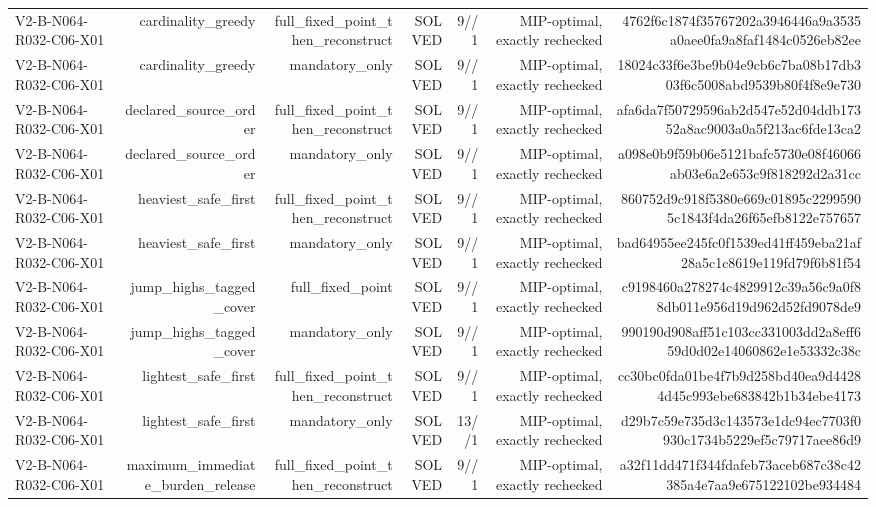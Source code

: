 {\begin{longtable}{lrrrrrr}
V2-B-N064-R032-C06-X01 & cardinality\_greedy & full\_fixed\_point\_then\_reconstruct & SOLVED & 9//1 & MIP-optimal, exactly rechecked & 4762f6c1874f35767202a3946446a9a3535a0aee0fa9a8faf1484c0526eb82ee \\
V2-B-N064-R032-C06-X01 & cardinality\_greedy & mandatory\_only & SOLVED & 9//1 & MIP-optimal, exactly rechecked & 18024c33f6e3be9b04e9cb6c7ba08b17db303f6c5008abd9539b80f4f8e9e730 \\
V2-B-N064-R032-C06-X01 & declared\_source\_order & full\_fixed\_point\_then\_reconstruct & SOLVED & 9//1 & MIP-optimal, exactly rechecked & afa6da7f50729596ab2d547e52d04ddb17352a8ac9003a0a5f213ac6fde13ca2 \\
V2-B-N064-R032-C06-X01 & declared\_source\_order & mandatory\_only & SOLVED & 9//1 & MIP-optimal, exactly rechecked & a098e0b9f59b06e5121bafc5730e08f46066ab03e6a2e653c9f818292d2a31cc \\
V2-B-N064-R032-C06-X01 & heaviest\_safe\_first & full\_fixed\_point\_then\_reconstruct & SOLVED & 9//1 & MIP-optimal, exactly rechecked & 860752d9c918f5380e669c01895c22995905c1843f4da26f65efb8122e757657 \\
V2-B-N064-R032-C06-X01 & heaviest\_safe\_first & mandatory\_only & SOLVED & 9//1 & MIP-optimal, exactly rechecked & bad64955ee245fc0f1539ed41ff459eba21af28a5c1c8619e119fd79f6b81f54 \\
V2-B-N064-R032-C06-X01 & jump\_highs\_tagged\_cover & full\_fixed\_point & SOLVED & 9//1 & MIP-optimal, exactly rechecked & c9198460a278274c4829912c39a56c9a0f88db011e956d19d962d52fd9078de9 \\
V2-B-N064-R032-C06-X01 & jump\_highs\_tagged\_cover & mandatory\_only & SOLVED & 9//1 & MIP-optimal, exactly rechecked & 990190d908aff51c103cc331003dd2a8eff659d0d02e14060862e1e53332c38c \\
V2-B-N064-R032-C06-X01 & lightest\_safe\_first & full\_fixed\_point\_then\_reconstruct & SOLVED & 9//1 & MIP-optimal, exactly rechecked & cc30bc0fda01be4f7b9d258bd40ea9d44284d45c993ebe683842b1b34ebe4173 \\
V2-B-N064-R032-C06-X01 & lightest\_safe\_first & mandatory\_only & SOLVED & 13//1 & MIP-optimal, exactly rechecked & d29b7c59e735d3c143573e1dc94ec7703f0930c1734b5229ef5c79717aee86d9 \\
V2-B-N064-R032-C06-X01 & maximum\_immediate\_burden\_release & full\_fixed\_point\_then\_reconstruct & SOLVED & 9//1 & MIP-optimal, exactly rechecked & a32f11dd471f344fdafeb73aceb687c38c42385a4e7aa9e675122102be934484 \\

\end{longtable}}
